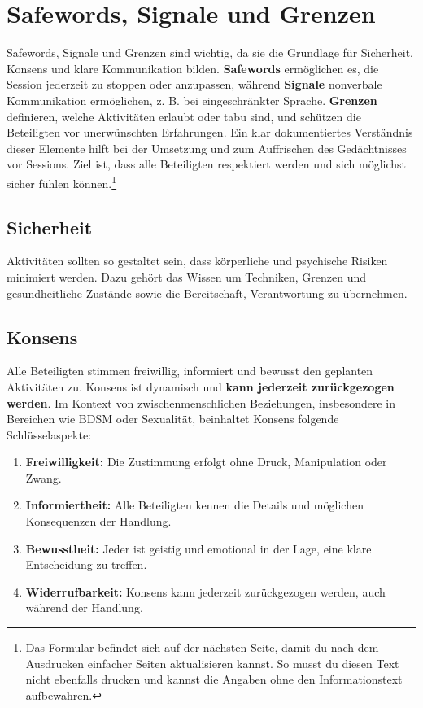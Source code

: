\documentclass[a4paper,12pt]{article}
\begin{document}

\newpage
\section{Safewords, Signale und Grenzen}
Safewords, Signale und Grenzen sind wichtig, da sie die Grundlage für Sicherheit, Konsens und klare Kommunikation bilden. \textbf{Safewords} ermöglichen es, die Session jederzeit zu stoppen oder anzupassen, während \textbf{Signale} nonverbale Kommunikation ermöglichen, z. B. bei eingeschränkter Sprache. \textbf{Grenzen} definieren, welche Aktivitäten erlaubt oder tabu sind, und schützen die Beteiligten vor unerwünschten Erfahrungen. Ein klar dokumentiertes Verständnis dieser Elemente hilft bei der Umsetzung und zum Auffrischen des Gedächtnisses vor Sessions. Ziel ist, dass alle Beteiligten respektiert werden und sich möglichst sicher fühlen können.\footnote{Das Formular befindet sich auf der nächsten Seite, damit du nach dem Ausdrucken einfacher Seiten aktualisieren kannst. So musst du diesen Text nicht ebenfalls drucken und kannst die Angaben ohne den Informationstext aufbewahren.}

 \subsection{Sicherheit}
Aktivitäten sollten so gestaltet sein, dass körperliche und psychische Risiken minimiert werden. Dazu gehört das Wissen um Techniken, Grenzen und gesundheitliche Zustände sowie die Bereitschaft, Verantwortung zu übernehmen.

 \subsection{Konsens}\label{cons}
Alle Beteiligten stimmen freiwillig, informiert und bewusst den geplanten Aktivitäten zu. Konsens ist dynamisch und \textbf{kann jederzeit zurückgezogen werden}. Im Kontext von zwischenmenschlichen Beziehungen, insbesondere in Bereichen wie BDSM oder Sexualität, beinhaltet Konsens folgende Schlüsselaspekte:
\begin{enumerate}
	\item \textbf{Freiwilligkeit:} Die Zustimmung erfolgt ohne Druck, Manipulation oder Zwang.
	\item \textbf{Informiertheit:} Alle Beteiligten kennen die Details und möglichen Konsequenzen der Handlung.
	\item \textbf{Bewusstheit:} Jeder ist geistig und emotional in der Lage, eine klare Entscheidung zu treffen.
	\item \textbf{Widerrufbarkeit:} Konsens kann jederzeit zurückgezogen werden, auch während der Handlung.
\end{enumerate}
\end{document}
